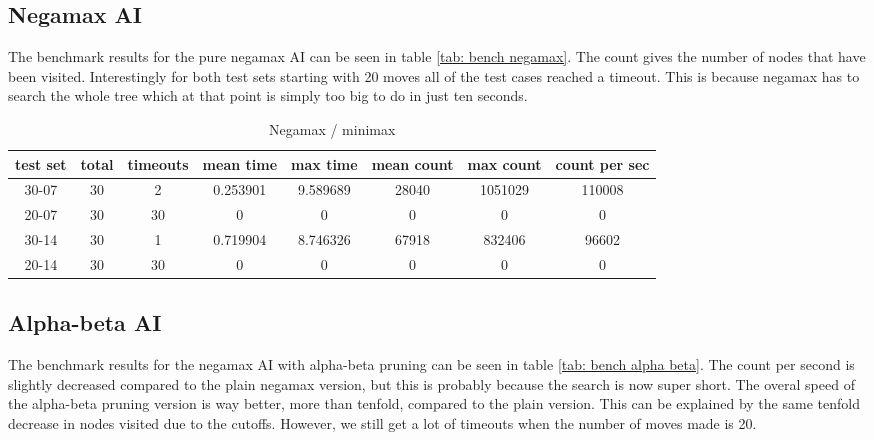 \documentclass[a4paper]{article}
\begin{document}
\subsection{Negamax AI}
The benchmark results for the pure negamax AI can be seen in table \ref{tab:
bench negamax}. The count gives the number of nodes that have been visited.
Interestingly for both test sets starting with 20 moves all of the test cases
reached a timeout. This is because negamax has to search the whole tree which
at that point is simply too big to do in just ten seconds.

\begin{table}[h]
	\centering
	\begin{adjustbox}{center}
	\begin{tabular}{|c|c|c|c|c|c|c|c|}\hline
	\textbf{test set} & \textbf{total} & \textbf{timeouts} & \textbf{mean time} & \textbf{max time} & \textbf{mean count} & \textbf{max count} & \textbf{count per sec} \\\hline
	30-07 & 30 & 2 & 0.253901 & 9.589689 & 28040 & 1051029 & 110008 \\\hline
	20-07 & 30 & 30 & 0 & 0 & 0 & 0 & 0 \\\hline
	30-14 & 30 & 1 & 0.719904 & 8.746326 & 67918 & 832406 & 96602 \\\hline
	20-14 & 30 & 30 & 0 & 0 & 0 & 0 & 0 \\\hline
	\end{tabular}
	\end{adjustbox}
	\caption{Negamax / minimax}
	\label{tab: bench negamax}
\end{table}

\subsection{Alpha-beta AI}
The benchmark results for the negamax AI with alpha-beta pruning can be seen in
table \ref{tab: bench alpha beta}. The count per second is slightly decreased
compared to the plain negamax version, but this is probably because the search
is now super short. The overal speed of the alpha-beta pruning version is way
better, more than tenfold, compared to the plain version. This can be explained
by the same tenfold decrease in nodes visited due to the cutoffs. However, we
still get a lot of timeouts when the number of moves made is 20.
\end{document}
